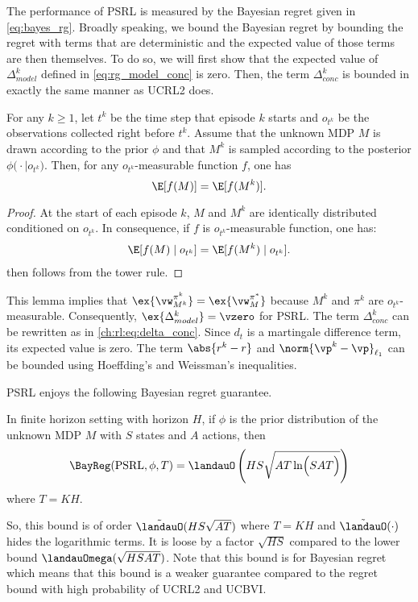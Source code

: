 The performance of PSRL is measured by the Bayesian regret given in \eqref{eq:bayes_rg}.
Broadly speaking, we bound the Bayesian regret by bounding the regret with terms that are deterministic and the expected value of those terms are then themselves.
To do so, we will first show that the expected value of $\Delta^k_{model}$ defined in \eqref{eq:rg_model_conc} is zero.
Then, the term $\Delta^k_{conc}$ is bounded in exactly the same manner as UCRL2 does.
\begin{lem}
    \label{lem:expected_identity}
    For any $k\ge1$, let $t^k$ be the time step that episode $k$ starts and $o_{t^k}$ be the observations collected right before $t^k$.
    Assume that the unknown MDP $M$ is drawn according to the prior $\phi$ and that $M^k$ is sampled according to the posterior $\phi\bigl(\cdot\mid o_{t^k}\bigr)$. Then, for any $o_{t^k}$-measurable function $f$, one has
    \begin{equation}
        \label{eq:exp_iden}
        \E[f(M)] =\E[f(M^k)].
    \end{equation}
\end{lem}
\begin{proof}
    At the start of each episode $k$, $M$ and $M^k$ are identically distributed conditioned on $o_{t^k}$.
    In consequence, if $f$ is $o_{t^k}$-measurable function, one has:
    \begin{align*}    
        \E[f(M) \mid o_{t^k}] =\E[f(M^k) \mid o_{t^k}].
    \end{align*}
     then follows from the tower rule.
\end{proof}
This lemma implies that $\ex{\vw^{\pi^k}_{M^k}}=\ex{\vw^{\pi^*}_M}$ because $M^k$ and $\pi^k$ are $o_{t^k}$-measurable.
Consequently, $\ex{\Delta^k_{model}}=\vzero$ for PSRL.
The term $\Delta^k_{conc}$ can be rewritten as in \eqref{ch:rl:eq:delta_conc}.
Since $d_t$ is a martingale difference term, its expected value is zero.
The term $\abs{r^k-r}$ and $\norm{\vp^k-\vp}_{\ell_1}$ can be bounded using Hoeffding's and Weissman's inequalities.

PSRL enjoys the following Bayesian regret guarantee.
\begin{prop}
    \label{prop:brg_psrl}
    In finite horizon setting with horizon $H$, if $\phi$ is the prior distribution of the unknown MDP $M$ with $S$ states and $A$ actions, then
    \begin{equation}
        \label{eq:brg_psrl}
        \BayReg(\textnormal{PSRL}, \phi, T) = \landauO\left(HS\sqrt{AT\ln\Bigl(SAT\Bigr)}\right)
    \end{equation}
    where $T=KH$.
\end{prop}
So, this bound is of order $\tilde{\landauO}(HS\sqrt{AT})$ where $T=KH$ and $\tilde{\landauO}(\cdot)$ hides the logarithmic terms.
It is loose by a factor $\sqrt{HS}$ compared to the lower bound $\landauOmega(\sqrt{HSAT})$.
Note that this bound is for Bayesian regret which means that this bound is a weaker guarantee compared to the regret bound with high probability of UCRL2 and UCBVI.

